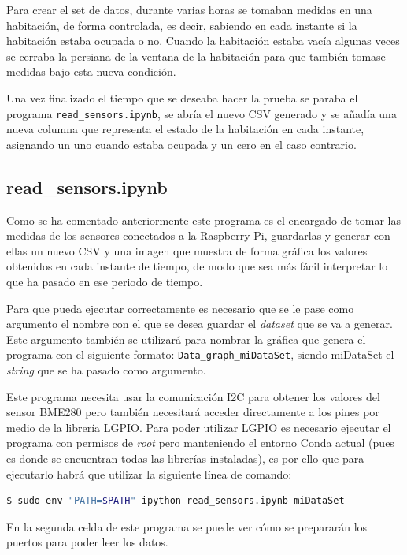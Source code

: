 \documentclass[a4paper, 12pt]{book}
\begin{document}
 Para crear el set de datos, durante varias horas se tomaban medidas en una habitación, de forma controlada, es decir, sabiendo en cada instante si la habitación estaba ocupada o no. Cuando la habitación estaba vacía algunas veces se cerraba la persiana de la ventana de la habitación para que también tomase medidas bajo esta nueva condición.

Una vez finalizado el tiempo que se deseaba hacer la prueba se paraba el programa \texttt{read\_sensors.ipynb}, se abría el nuevo CSV generado y se añadía una nueva columna que representa el estado de la habitación en cada instante, asignando un uno cuando estaba ocupada y un cero en el caso contrario.

\subsection{read\_sensors.ipynb}
\label{subsec_read_sensors}

Como se ha comentado anteriormente este programa es el encargado de tomar las medidas de los sensores conectados a la Raspberry Pi, guardarlas y generar con ellas un nuevo CSV y una imagen que muestra de forma gráfica los valores obtenidos en cada instante de tiempo, de modo que sea más fácil interpretar lo que ha pasado en ese periodo de tiempo. 

Para que pueda ejecutar correctamente es necesario que se le pase como argumento el nombre con el que se desea guardar el \textit{dataset} que se va a generar. Este argumento también se utilizará para nombrar la gráfica que genera el programa con el siguiente formato: \texttt{Data\_graph\_miDataSet}, siendo miDataSet el \textit{string} que se ha pasado como argumento.

Este programa necesita usar la comunicación I2C para obtener los valores del sensor BME280 pero también necesitará acceder directamente a los pines por medio de la librería LGPIO. Para poder utilizar LGPIO es necesario ejecutar el programa con permisos de \textit{root} pero manteniendo el entorno Conda actual (pues es donde se encuentran todas las librerías instaladas), es por ello que para ejecutarlo habrá que utilizar la siguiente línea de comando: \\

\begin{lstlisting}[language=bash]
    $ sudo env "PATH=$PATH" ipython read_sensors.ipynb miDataSet
\end{lstlisting}

En la segunda celda de este programa se puede ver cómo se prepararán los puertos para poder leer los datos. 
\end{document}
